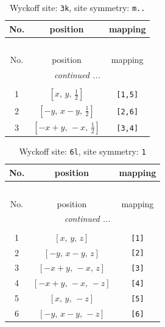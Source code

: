 \documentclass[fleqn,8pt]{jsarticle}
\begin{document}
\begin{longtable}{ccc}
\caption{Wyckoff site: {\tt 3k}, site symmetry: {\tt m..}}
 \\
 \hline \hline
No. & position & mapping \\ \hline \endfirsthead

\multicolumn{2}{l}{\tablename\ \thetable{}} \\
 \hline \hline
No. & position & mapping \\ \hline \endhead

 \hline \hline
\multicolumn{2}{r}{\footnotesize\it continued ...} \\ \endfoot

 \hline \hline
\multicolumn{2}{r}{} \\ \endlastfoot

1 & $\left[ x,\, y,\, \frac{1}{2} \right]$ & {\tt [1,5]} \\ \hline
2 & $\left[ - y,\, x - y,\, \frac{1}{2} \right]$ & {\tt [2,6]} \\ \hline
3 & $\left[ - x + y,\, - x,\, \frac{1}{2} \right]$ & {\tt [3,4]} \\
\end{longtable}
\renewcommand{\arraystretch}{1.2}
\begin{longtable}{ccc}
\caption{Wyckoff site: {\tt 6l}, site symmetry: {\tt 1}}
 \\
 \hline \hline
No. & position & mapping \\ \hline \endfirsthead

\multicolumn{2}{l}{\tablename\ \thetable{}} \\
 \hline \hline
No. & position & mapping \\ \hline \endhead

 \hline \hline
\multicolumn{2}{r}{\footnotesize\it continued ...} \\ \endfoot

 \hline \hline
\multicolumn{2}{r}{} \\ \endlastfoot

1 & $\left[ x,\, y,\, z \right]$ & {\tt [1]} \\ \hline
2 & $\left[ - y,\, x - y,\, z \right]$ & {\tt [2]} \\ \hline
3 & $\left[ - x + y,\, - x,\, z \right]$ & {\tt [3]} \\ \hline
4 & $\left[ - x + y,\, - x,\, - z \right]$ & {\tt [4]} \\ \hline
5 & $\left[ x,\, y,\, - z \right]$ & {\tt [5]} \\ \hline
6 & $\left[ - y,\, x - y,\, - z \right]$ & {\tt [6]} \\
\end{longtable}
\end{document}
